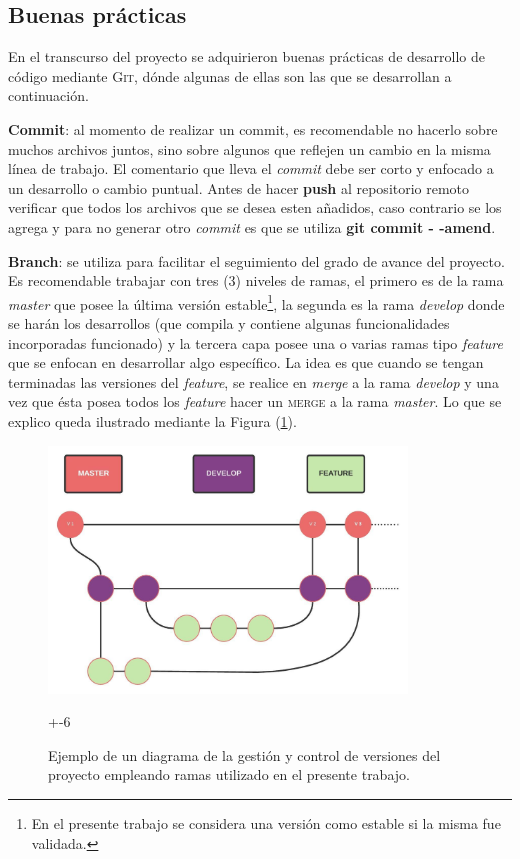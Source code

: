 \subsection{Buenas prácticas}

En el transcurso del proyecto se adquirieron buenas prácticas de desarrollo de código mediante \textsc{Git}, dónde algunas de ellas son las que se desarrollan a continuación.

\textbf{Commit}: al momento de realizar un commit, es recomendable no hacerlo sobre muchos archivos juntos, sino sobre algunos que reflejen un cambio en la misma línea de trabajo. El comentario que lleva el \textit{commit} debe ser corto y enfocado a un desarrollo o cambio puntual. Antes de hacer \textbf{push} al repositorio remoto verificar que todos los archivos que se desea esten añadidos, caso contrario se los agrega y para no generar otro \textit{commit} es que se utiliza \textbf{git commit - -amend}.

\textbf{Branch}: se utiliza para facilitar el seguimiento del grado de avance del proyecto. Es recomendable trabajar con tres (3) niveles de ramas, el primero es de la rama \textit{master} que posee la última versión estable\footnote{En el presente trabajo se considera una versión como estable si la misma fue validada.}, la segunda es la rama \textit{develop} donde se harán los desarrollos (que compila y contiene algunas funcionalidades incorporadas funcionado)
y la tercera capa posee una o varias ramas tipo \textit{feature} que se enfocan en desarrollar algo específico. La idea es que cuando se tengan terminadas las versiones del \textit{feature}, se realice en \textit{merge} a la rama \textit{develop} y una vez que ésta posea todos los \textit{feature} hacer un \textsc{merge} a la rama \textit{master}. Lo que se explico queda ilustrado mediante la Figura (\ref{fig:ramas}).
 
 \begin{figure}[htbp]
 	\centering
 	\includegraphics[width=0.85\textwidth]{figs/cap3/ejemplo_ramas}
 	\caption{Ejemplo de un diagrama de la gestión y control de versiones del proyecto empleando ramas utilizado en el presente trabajo.}
+-6 	\label{fig:ramas}	
 \end{figure}
 
